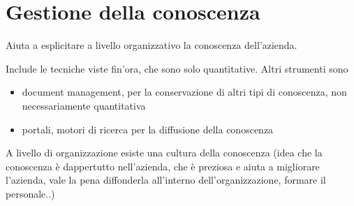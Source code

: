 \section{Gestione della conoscenza}\label{gestione-della-conoscenza}

Aiuta a esplicitare a livello organizzativo la conoscenza dell'azienda.

Include le tecniche viste fin'ora, che sono solo quantitative. Altri
strumenti sono

\begin{itemize}

\item
  document management, per la conservazione di altri tipi di conoscenza,
  non necessariamente quantitativa
\item
  portali, motori di ricerca per la diffusione della conoscenza
\end{itemize}

A livello di organizzazione esiste una cultura della conoscenza (idea
che la conoscenza \`e dappertutto nell'azienda, che \`e preziosa e aiuta a
migliorare l'azienda, vale la pena diffonderla all'interno
dell'organizzazione, formare il personale..)
